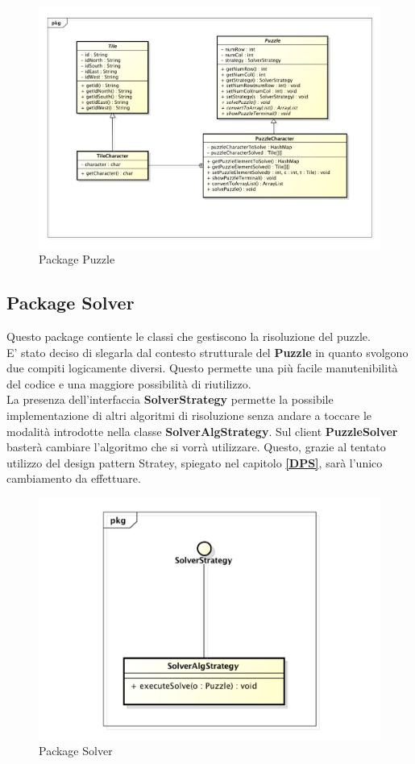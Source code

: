 		\begin{figure}[htbp]
			\centering
			\includegraphics[width=15cm]{img/Puzzle.pdf}
			\caption{Package Puzzle}
			\label{Package Puzzle}
		\end{figure}

	\subsection{Package Solver}
Questo package contiente le classi che gestiscono la risoluzione del puzzle. \\
E' stato deciso di slegarla dal contesto strutturale del \textbf{Puzzle} in quanto svolgono due compiti logicamente diversi. Questo permette una più facile manutenibilità del codice e una maggiore possibilità di riutilizzo. \\
La presenza dell'interfaccia \textbf{SolverStrategy} permette la possibile implementazione di altri algoritmi di risoluzione senza andare a toccare le modalità introdotte nella classe \textbf{SolverAlgStrategy}. Sul client \textbf{PuzzleSolver} basterà cambiare l'algoritmo che si vorrà utilizzare. Questo, grazie al tentato utilizzo del design pattern Stratey, spiegato nel capitolo \textbf{\ref{DPS}}, sarà l'unico cambiamento da effettuare.
		\begin{figure}[htbp]
			\centering
			\includegraphics[width=15cm]{img/Solver.pdf}
			\caption{Package Solver}
			\label{Package Solver}
		\end{figure}
	
